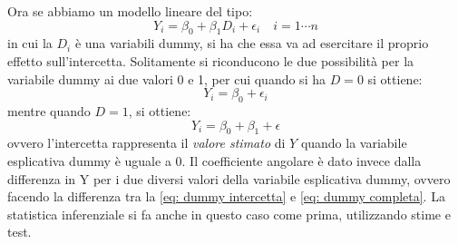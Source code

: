 \documentclass[]{article}
\begin{document}
Ora se abbiamo un modello lineare del tipo:
\begin{equation}
Y_i = \beta_0 + \beta_1 D_i + \epsilon_i \quad i=1 \cdots n
\end{equation}
in cui la $D_i$ è una variabili dummy, si ha che essa va ad esercitare il proprio effetto sull'intercetta. Solitamente si riconducono le due possibilità per la variabile dummy ai due valori 0 e 1, per cui quando si ha $D=0$ si ottiene:
\begin{equation}
Y_i = \beta_0 + \epsilon_i
\label{eq: dummy intercetta}
\end{equation}
mentre quando $D=1$, si ottiene:
\begin{equation}
Y_i = \beta_0 + \beta_1 + \epsilon
\label{eq: dummy completa}
\end{equation}
ovvero l'intercetta rappresenta il \textit{valore stimato} di $Y$ quando la variabile esplicativa dummy è uguale a 0. Il coefficiente angolare è dato invece dalla differenza in Y per i due diversi valori della variabile esplicativa dummy, ovvero facendo la differenza tra la \eqref{eq: dummy intercetta} e \eqref{eq: dummy completa}.
La statistica inferenziale si fa anche in questo caso come prima, utilizzando stime e test.
\end{document}
